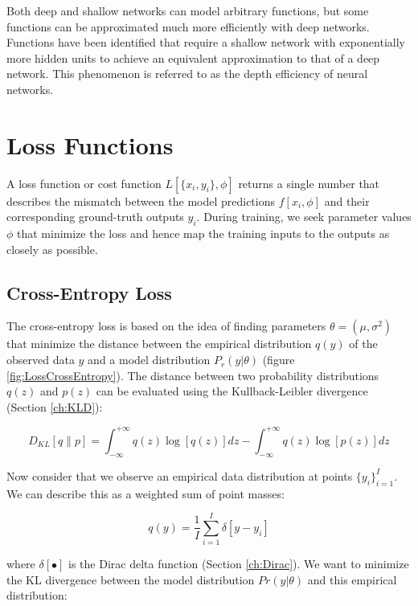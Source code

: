 \noindent Both deep and shallow networks can model arbitrary functions, but some functions can be approximated much more efficiently with deep networks. Functions have been identified that require a shallow network with exponentially more hidden units to achieve an equivalent approximation to that of a deep network. This phenomenon is referred to as the depth efficiency of neural networks.

\section{Loss Functions}
A loss function or cost function $L[\{x_{i},y_{i}\},\phi]$ returns a single number that describes the mismatch between the model predictions $f[x_{i}, \phi]$ and their corresponding ground-truth outputs $y_{i}$. During training, we seek parameter values $\phi$ that minimize the loss and hence map the training inputs to the outputs as closely as possible.

\subsection{Cross-Entropy Loss}
The cross-entropy loss is based on the idea of finding parameters $\theta= (\mu, \sigma^{2})$ that minimize the distance between the empirical distribution $q(y)$ of the observed data $y$ and a model distribution $P_{r}(y|\theta)$ (figure \ref{fig:LossCrossEntropy}). The distance between two probability distributions $q(z)$ and $p(z)$ can be evaluated using the Kullback-Leibler divergence (Section \ref{ch:KLD}):

\begin{equation}
    D_{KL}[q \| p] = \int_{-\infty}^{+\infty} q(z) \log [q(z)] d z-\int_{-\infty}^{+\infty} q(z) \log [p(z)] d z
\end{equation}

\noindent Now consider that we observe an empirical data distribution at points $\{y_{i}\}^{I}_{i=1}$. We can describe this as a weighted sum of point masses:

\begin{equation}
    q(y)=\frac{1}{I} \sum_{i=1}^{I} \delta\left[y-y_{i}\right]
    \label{eq:EmpiricalDistribution}
\end{equation}

\noindent where $\delta[\bullet]$ is the Dirac delta function (Section \ref{ch:Dirac}). We want to minimize the KL divergence between the model distribution $Pr(y|\theta)$ and this empirical distribution:


